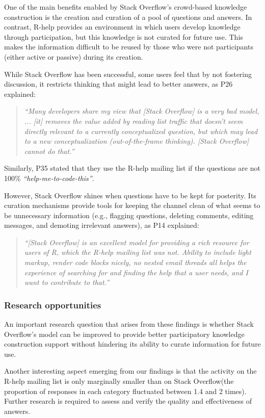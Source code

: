 \documentclass[smallextended]{svjour3}       %
\newcommand{\SO}{Stack Overflow\xspace}
\newcommand{\RH}{R-help\xspace}
\begin{document}
One of the main benefits enabled by \SO's crowd-based knowledge construction is the creation and curation of a pool of questions and answers. In contrast, \RH provides an environment in which users
    develop knowledge through participation, but this knowledge is not curated for future use. This makes the information difficult to be reused by those who were not
    participants (either active or passive) during its creation.


            While \SO has been successful, some users feel that by not fostering discussion, it restricts thinking that might lead to better answers, as P26 explained:
    \begin{quote}
        \textit{``Many developers share my view that [\SO] is a very bad model, ... [it] removes the value added by reading list traffic that doesn't seem directly relevant to a currently conceptualized question, but which may lead to a new conceptualization (out-of-the-frame thinking). [\SO] cannot do that.''}
    \end{quote}
    Similarly, P35 stated that they use the \RH mailing list if the questions are not 100\% \textit{``help-me-to-code-this''}.

    However, \SO shines when questions have to be kept for posterity. 
    Its curation mechanisms provide tools for keeping the channel clean of what seems to be unnecessary information (e.g., flagging questions, deleting comments, editing messages, and demoting irrelevant answers), as P14 explained:

    \begin{quote}
        \textit{``[\SO] is an excellent model for providing a rich resource for users of R, which the \RH mailing list was not. 
        Ability to include light markup, render code blocks nicely, no nested email threads all helps the experience of searching for and finding the help that a user needs, and I want to contribute to that.''}
    \end{quote}

        
\subsubsection{Research opportunities}

An important research question that arises from these findings is whether \SO's model can be improved to provide better participatory knowledge construction support without hindering its ability to curate information for future use.

Another interesting aspect emerging from our findings is that the activity on the \RH mailing list is only marginally smaller than on \SO (the proportion of responses in each category fluctuated between 1.4 and 2 times). Further research is required to assess and verify the quality and effectiveness of answers.
\end{document}

